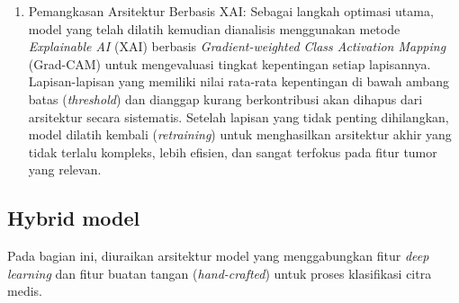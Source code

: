 \begin{enumerate}
	\item Pemangkasan Arsitektur Berbasis XAI:
	Sebagai langkah optimasi utama, model yang telah dilatih kemudian dianalisis menggunakan metode \textit{Explainable AI} (XAI) berbasis \textit{Gradient-weighted Class Activation Mapping} (Grad-CAM) untuk mengevaluasi tingkat kepentingan setiap lapisannya. Lapisan-lapisan yang memiliki nilai rata-rata kepentingan di bawah ambang batas (\textit{threshold}) dan dianggap kurang berkontribusi akan dihapus dari arsitektur secara sistematis. Setelah lapisan yang tidak penting dihilangkan, model dilatih kembali (\textit{retraining}) untuk menghasilkan arsitektur akhir yang tidak terlalu kompleks, lebih efisien, dan sangat terfokus pada fitur tumor yang relevan.
\end{enumerate}

\subsection{Hybrid model}
Pada bagian ini, diuraikan arsitektur model yang menggabungkan fitur \textit{deep learning} dan fitur buatan tangan (\textit{hand-crafted}) untuk proses klasifikasi citra medis.

